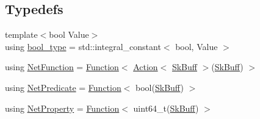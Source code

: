 \subsection*{Typedefs}
\begin{DoxyCompactItemize}
\item 
{\footnotesize template$<$bool Value$>$ }\\using \hyperlink{namespacepfq_1_1lang_a9e5878bb1c3720d53960d8218107fe2c}{bool\+\_\+type} = std\+::integral\+\_\+constant$<$ bool, Value $>$
\item 
using \hyperlink{namespacepfq_1_1lang_aa02ee91ad7ff586907fc8526b84e0f53}{Net\+Function} = \hyperlink{structpfq_1_1lang_1_1Function}{Function}$<$ \hyperlink{structpfq_1_1lang_1_1Action}{Action}$<$ \hyperlink{structpfq_1_1lang_1_1SkBuff}{Sk\+Buff} $>$(\hyperlink{structpfq_1_1lang_1_1SkBuff}{Sk\+Buff}) $>$
\item 
using \hyperlink{namespacepfq_1_1lang_a3c5b96416a3c3834aefd442157498bbd}{Net\+Predicate} = \hyperlink{structpfq_1_1lang_1_1Function}{Function}$<$ bool(\hyperlink{structpfq_1_1lang_1_1SkBuff}{Sk\+Buff}) $>$
\item 
using \hyperlink{namespacepfq_1_1lang_aa39ba7aedac05c562ea2f9f399e7f370}{Net\+Property} = \hyperlink{structpfq_1_1lang_1_1Function}{Function}$<$ uint64\+\_\+t(\hyperlink{structpfq_1_1lang_1_1SkBuff}{Sk\+Buff}) $>$
\end{DoxyCompactItemize}

